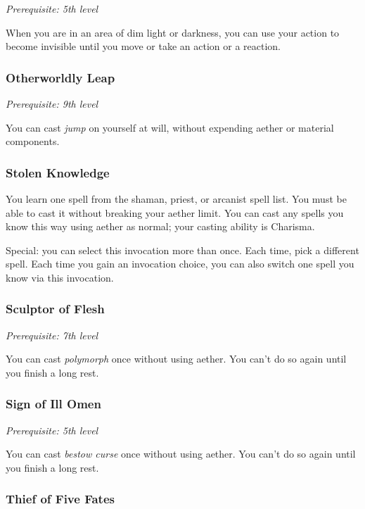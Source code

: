 \textit{Prerequisite: 5th level}

When you are in an area of dim light or darkness, you can use your action to become invisible until you move or take an action or a reaction.

\subsubsection{Otherworldly Leap}

\textit{Prerequisite: 9th level}

You can cast \textit{jump} on yourself at will, without expending aether or material components.

\subsubsection{Stolen Knowledge}

You learn one spell from the shaman, priest, or arcanist spell list. You must be able to cast it without breaking your aether limit. You can cast any spells you know this way using aether as normal; your casting ability is Charisma.

Special: you can select this invocation more than once. Each time, pick a different spell. Each time you gain an invocation choice, you can also switch one spell you know via this invocation.

\subsubsection{Sculptor of Flesh}

\textit{Prerequisite: 7th level}

You can cast \textit{polymorph} once without using aether. You can't do so again until you finish a long rest.

\subsubsection{Sign of Ill Omen}

\textit{Prerequisite: 5th level}

You can cast \textit{bestow curse} once without using aether. You can't do so again until you finish a long rest.

\subsubsection{Thief of Five Fates}

